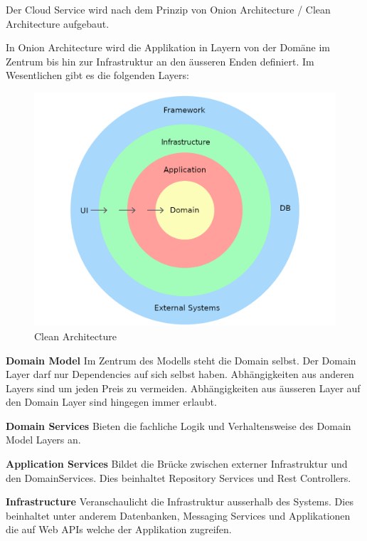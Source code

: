 Der Cloud Service wird nach dem Prinzip von Onion Architecture / Clean Architecture aufgebaut.

In Onion Architecture wird die Applikation in Layern von der Domäne im Zentrum bis hin zur Infrastruktur an den äusseren Enden definiert.
Im Wesentlichen gibt es die folgenden Layers:

\begin{figure}[h]
    \centering
    \begin{minipage}[b]{0.5\textwidth}
        \includegraphics[width=\textwidth]{graphics/clean-architecture}
        \caption{Clean Architecture}
    \end{minipage}
\end{figure}

\textbf{Domain Model}
Im Zentrum des Modells steht die Domain selbst.
Der Domain Layer darf nur Dependencies auf sich selbst haben.
Abhängigkeiten aus anderen Layers sind um jeden Preis zu vermeiden.
Abhängigkeiten aus äusseren Layer auf den Domain Layer sind hingegen immer erlaubt.

\textbf{Domain Services}
Bieten die fachliche Logik und Verhaltensweise des Domain Model Layers an.

\textbf{Application Services}
Bildet die Brücke zwischen externer Infrastruktur und den DomainServices.
Dies beinhaltet Repository Services und Rest Controllers.

\textbf{Infrastructure}
Veranschaulicht die Infrastruktur ausserhalb des Systems.
Dies beinhaltet unter anderem Datenbanken, Messaging Services und Applikationen die auf Web APIs welche der Applikation zugreifen.

